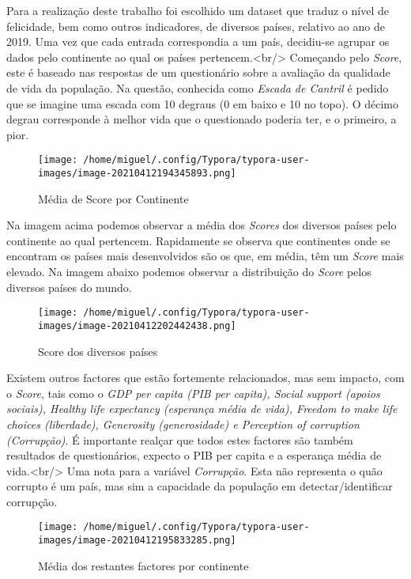 \documentclass[]{article}
\begin{document}
Para a realização deste trabalho foi escolhido um dataset que traduz o
nível de felicidade, bem como outros indicadores, de diversos países,
relativo ao ano de 2019. Uma vez que cada entrada correspondia a um
país, decidiu-se agrupar os dados pelo continente ao qual os países
pertencem.\textless{}br/\textgreater{} Começando pelo \emph{Score}, este
é baseado nas respostas de um questionário sobre a avaliação da
qualidade de vida da população. Na questão, conhecida como \emph{Escada
de Cantril} é pedido que se imagine uma escada com 10 degraus (0 em
baixo e 10 no topo). O décimo degrau corresponde à melhor vida que o
questionado poderia ter, e o primeiro, a pior.

\begin{figure}
\centering
\texttt{[image: /home/miguel/.config/Typora/typora-user-images/image-20210412194345893.png]}
\caption{Média de Score por Continente}
\end{figure}

Na imagem acima podemos observar a média dos \emph{Scores} dos diversos
países pelo continente ao qual pertencem. Rapidamente se observa que
continentes onde se encontram os países mais desenvolvidos são os que,
em média, têm um \emph{Score} mais elevado. Na imagem abaixo podemos
observar a distribuição do \emph{Score} pelos diversos países do mundo.

\begin{figure}
\centering
\texttt{[image: /home/miguel/.config/Typora/typora-user-images/image-20210412202442438.png]}
\caption{Score dos diversos países}
\end{figure}

Existem outros factores que estão fortemente relacionados, mas sem
impacto, com o \emph{Score}, tais como o \emph{GDP per capita (PIB per
capita), Social support (apoios sociais), Healthy life expectancy
(esperança média de vida), Freedom to make life choices (liberdade),
Generosity (generosidade) e Perception of corruption (Corrupção)}. É
importante realçar que todos estes factores são também resultados de
questionários, expecto o PIB per capita e a esperança média de
vida.\textless{}br/\textgreater{} Uma nota para a variável
\emph{Corrupção}. Esta não representa o quão corrupto é um país, mas sim
a capacidade da população em detectar/identificar corrupção.

\begin{figure}
\centering
\texttt{[image: /home/miguel/.config/Typora/typora-user-images/image-20210412195833285.png]}
\caption{Média dos restantes factores por continente}
\end{figure}
\end{document}
